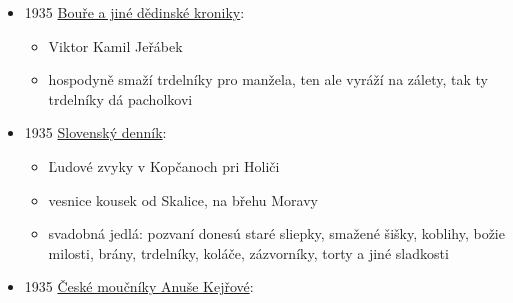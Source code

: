 \begin{itemize}
  \begin{itemize}
  \tightlist
  \item
    není online, 
  \item
    tak rok 1934 to asi není, tam je na straně 66 článek o odvodech v
    okolí Novýho Města na Moravě. Na Google Books je psaný ročník 21-23,
    tak možná je to v jednom z těch drhých dvouch ročníků.
  \item
    s. 66: Velmi časté jsou dary nejmenovaným přátelům obce do Brna,
    zejména když vedla obec nějaký spor, pravidelně s vrchností. Tak r.
    1729 placeno do Lačnova u Poličky od dělání a bílení 24 loket
    cvilinku na ručníky a 30 loket podobného tlustého režného pro
    jednoho dobrého patrona v Brně. Mnoho stáli město advokáti, kteří je
    ve sporech zastupovali a jimž posílány často zvláštní dary. R. 1724
    posílána panu advokátovi v Brně černá zvěřina, ryby, při tom jeden
    trdelník obecní poslán. Dále 1 tucet
  \item
    je to fakt trdleník jako pečivo, nebo myslí trdelního kapra?
  \end{itemize}
\item
  1935
  \href{https://ceskadigitalniknihovna.cz/view/uuid:9e3e00c0-1eb9-11ed-bb16-005056827e52?page=uuid\%3Ac70b483f-d1ae-48f7-9b87-ec788605bd6c&fulltext=trdeln*&source=mzk}{Bouře
  a jiné dědinské kroniky}:

  \begin{itemize}
  \tightlist
  \item
    Viktor Kamil Jeřábek
  \item
    hospodyně smaží trdelníky pro manžela, ten ale vyráží na zálety, tak
    ty trdelníky dá pacholkovi
  \end{itemize}
\item
  1935
  \href{https://dikda.snk.sk/uuid/uuid:f4a7cb3d-7024-450f-80ce-8754a4385669}{Slovenský
  denník}:

  \begin{itemize}
  \tightlist
  \item
    Ľudové zvyky v Kopčanoch pri Holiči
  \item
    vesnice kousek od Skalice, na břehu Moravy
  \item
    svadobná jedlá: pozvaní donesú staré sliepky, smažené šišky,
    koblihy, božie milosti, brány, trdelníky, koláče, zázvorníky, torty
    a jiné sladkosti
  \end{itemize}
\item
  1935
  \href{https://ceskadigitalniknihovna.cz/uuid/uuid:4c97d083-d7fe-4dc1-b10a-8ff4c1bf1a7c}{České
  moučníky Anuše Kejřové}:


\end{itemize}
